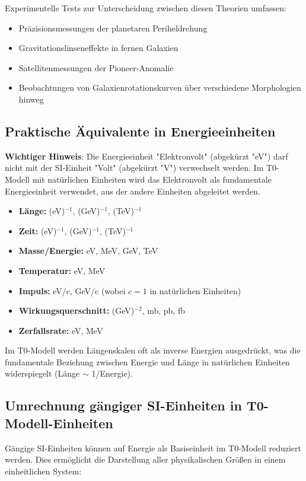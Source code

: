 \documentclass[12pt,a4paper]{article}
\begin{document}
Experimentelle Tests zur Unterscheidung zwischen diesen Theorien umfassen:
\begin{itemize}
	\item Präzisionsmessungen der planetaren Periheldrehung
	\item Gravitationslinseneffekte in fernen Galaxien
	\item Satellitenmessungen der Pioneer-Anomalie
	\item Beobachtungen von Galaxienrotationskurven über verschiedene Morphologien hinweg
\end{itemize}

\subsection*{Praktische Äquivalente in Energieeinheiten}

\textbf{Wichtiger Hinweis}: Die Energieeinheit "Elektronvolt" (abgekürzt "eV") darf nicht mit der SI-Einheit "Volt" (abgekürzt "V") verwechselt werden. Im T0-Modell mit natürlichen Einheiten wird das Elektronvolt als fundamentale Energieeinheit verwendet, aus der andere Einheiten abgeleitet werden.

\begin{itemize}
	\item \textbf{Länge:} (eV)$^{-1}$, (GeV)$^{-1}$, (TeV)$^{-1}$
	\item \textbf{Zeit:} (eV)$^{-1}$, (GeV)$^{-1}$, (TeV)$^{-1}$
	\item \textbf{Masse/Energie:} eV, MeV, GeV, TeV
	\item \textbf{Temperatur:} eV, MeV
	\item \textbf{Impuls:} eV/c, GeV/c (wobei $c=1$ in natürlichen Einheiten)
	\item \textbf{Wirkungsquerschnitt:} (GeV)$^{-2}$, mb, pb, fb
	\item \textbf{Zerfallsrate:} eV, MeV
\end{itemize}

Im T0-Modell werden Längenskalen oft als inverse Energien ausgedrückt, was die fundamentale Beziehung zwischen Energie und Länge in natürlichen Einheiten widerspiegelt (Länge $\sim$ 1/Energie).

\subsection*{Umrechnung gängiger SI-Einheiten in T0-Modell-Einheiten}

Gängige SI-Einheiten können auf Energie als Basiseinheit im T0-Modell reduziert werden. Dies ermöglicht die Darstellung aller physikalischen Größen in einem einheitlichen System:
\end{document}
